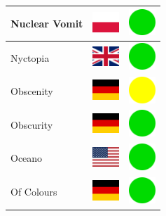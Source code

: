 \documentclass[12pt, a4paper, twoside]{report}
\begin{document}
\begin{center}
\begin{longtable}{|p{5cm}|p{2cm}|p{2cm}|}
Nuclear Vomit & \includegraphics[width=1cm]{4x3/pl} & \includegraphics[width=1cm]{likes/y} \\ \hline
Nyctopia & \includegraphics[width=1cm]{4x3/gb} & \includegraphics[width=1cm]{likes/y} \\ \hline
Obscenity & \includegraphics[width=1cm]{4x3/de} & \includegraphics[width=1cm]{likes/m} \\ \hline
Obscurity & \includegraphics[width=1cm]{4x3/de} & \includegraphics[width=1cm]{likes/y} \\ \hline
Oceano & \includegraphics[width=1cm]{4x3/us} & \includegraphics[width=1cm]{likes/y} \\ \hline
Of Colours & \includegraphics[width=1cm]{4x3/de} & \includegraphics[width=1cm]{likes/y} \\ \hline

\end{longtable}
\end{center}
\end{document}
